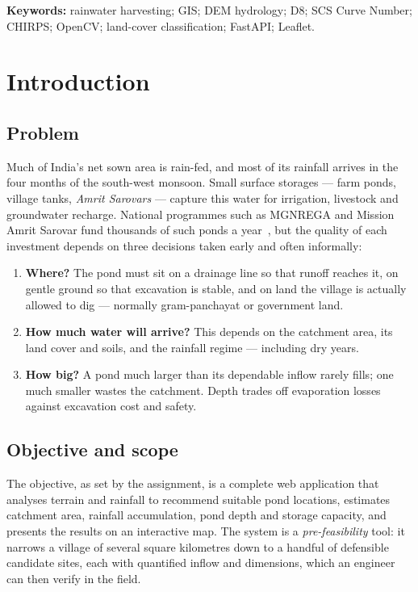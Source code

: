 \documentclass[11pt,a4paper]{article}
\begin{document}
\vspace{6pt}
\noindent\textbf{Keywords:} rainwater harvesting; GIS; DEM hydrology; D8; SCS Curve Number;
CHIRPS; OpenCV; land-cover classification; FastAPI; Leaflet.

\clearpage
\tableofcontents
\clearpage
\listoffigures
\listoftables
\clearpage
{}

\section{Introduction}
\subsection{Problem}
Much of India's net sown area is rain-fed, and most of its rainfall arrives in the four months
of the south-west monsoon. Small surface storages --- farm ponds, village tanks,
\emph{Amrit Sarovars} --- capture this water for irrigation, livestock and groundwater recharge.
National programmes such as MGNREGA and Mission Amrit Sarovar fund thousands of such ponds a
year~\cite{amritsarovar}, but the quality of each investment depends on three decisions taken
early and often informally:
\begin{enumerate}
  \item \textbf{Where?} The pond must sit on a drainage line so that runoff reaches it, on
        gentle ground so that excavation is stable, and on land the village is actually allowed
        to dig --- normally gram-panchayat or government land.
  \item \textbf{How much water will arrive?} This depends on the catchment area, its land
        cover and soils, and the rainfall regime --- including dry years.
  \item \textbf{How big?} A pond much larger than its dependable inflow rarely fills; one much
        smaller wastes the catchment. Depth trades off evaporation losses against excavation
        cost and safety.
\end{enumerate}

\subsection{Objective and scope}
The objective, as set by the assignment, is a complete web application that analyses terrain
and rainfall to recommend suitable pond locations, estimates catchment area, rainfall
accumulation, pond depth and storage capacity, and presents the results on an interactive map.
The system is a \emph{pre-feasibility} tool: it narrows a village of several square kilometres
down to a handful of defensible candidate sites, each with quantified inflow and dimensions,
which an engineer can then verify in the field.
\end{document}
